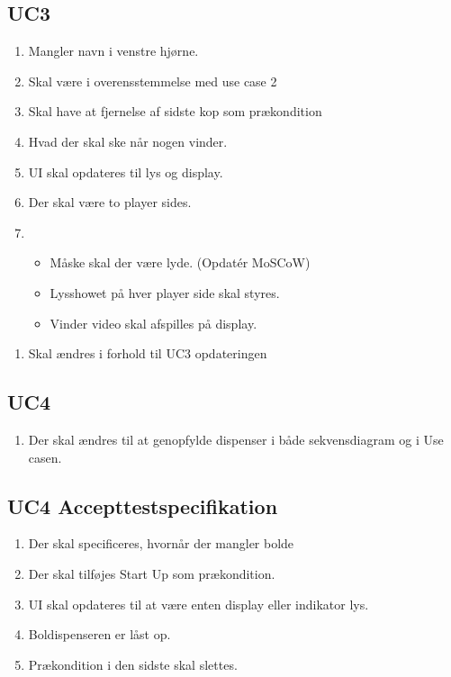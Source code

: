 \subsection{UC3}
\begin{enumerate}
    \item Mangler navn i venstre hjørne.
    \item Skal være i overensstemmelse med use case 2
    \item Skal have at fjernelse af sidste kop som prækondition
    \item Hvad der skal ske når nogen vinder.
    \item UI skal opdateres til lys og display.
    \item Der skal være to player sides.
    \item 
    \begin{itemize}
        \item Måske skal der være lyde. (Opdatér MoSCoW)
        \item Lysshowet på hver player side skal styres.
        \item Vinder video skal afspilles på display.
    \end{itemize}
\end{enumerate}
\begin{enumerate}
    \item Skal ændres i forhold til UC3 opdateringen
\end{enumerate}

\subsection{UC4}
\begin{enumerate}
    \item Der skal ændres til at genopfylde dispenser i både sekvensdiagram og i Use casen.
\end{enumerate}
\subsection{UC4 Accepttestspecifikation}
\begin{enumerate}
    \item Der skal specificeres, hvornår der mangler bolde
    \item Der skal tilføjes Start Up som prækondition.
    \item UI skal opdateres til at være enten display eller indikator lys.
    \item Boldispenseren er låst op.
    \item Prækondition i den sidste skal slettes.
\end{enumerate}